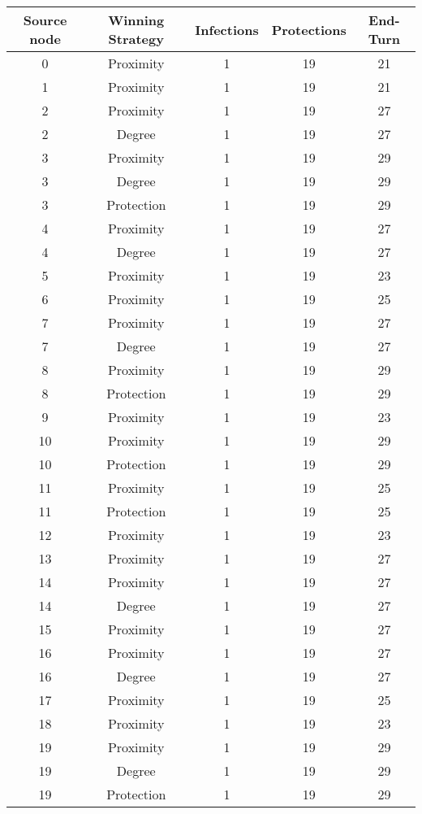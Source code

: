 \documentclass[results.tex]{subfiles}
\begin{document}
\begin{center}
  \begin{tabular}{| c || c | c | c | c |}
    \hline
    {\bfseries Source node} & {\bfseries Winning Strategy} & {\bfseries Infections} & {\bfseries Protections} & {\bfseries End-Turn} \\  %
    \hline\hline
    0 & Proximity & 1 & 19 & 21 \\
    \hline
    1 & Proximity & 1 & 19 & 21 \\
    \hline
    2 & Proximity & 1 & 19 & 27 \\
    \hline
    2 & Degree & 1 & 19 & 27 \\
    \hline
    3 & Proximity & 1 & 19 & 29 \\
    \hline
    3 & Degree & 1 & 19 & 29 \\
    \hline
    3 & Protection & 1 & 19 & 29 \\
    \hline
    4 & Proximity & 1 & 19 & 27 \\
    \hline
    4 & Degree & 1 & 19 & 27 \\
    \hline
    5 & Proximity & 1 & 19 & 23 \\
    \hline
    6 & Proximity & 1 & 19 & 25 \\
    \hline
    7 & Proximity & 1 & 19 & 27 \\
    \hline
    7 & Degree & 1 & 19 & 27 \\
    \hline
    8 & Proximity & 1 & 19 & 29 \\
    \hline
    8 & Protection & 1 & 19 & 29 \\
    \hline
    9 & Proximity & 1 & 19 & 23 \\
    \hline
    10 & Proximity & 1 & 19 & 29 \\
    \hline
    10 & Protection & 1 & 19 & 29 \\
    \hline
    11 & Proximity & 1 & 19 & 25 \\
    \hline 
    11 & Protection & 1 & 19 & 25 \\
    \hline
    12 & Proximity & 1 & 19 & 23 \\
    \hline
    13 & Proximity & 1 & 19 & 27 \\
    \hline
    14 & Proximity & 1 & 19 & 27 \\
    \hline
    14 & Degree & 1 & 19 & 27 \\
    \hline
    15 & Proximity & 1 & 19 & 27 \\
    \hline 
    16 & Proximity & 1 & 19 & 27 \\
    \hline
    16 & Degree & 1 & 19 & 27 \\
    \hline
    17 & Proximity & 1 & 19 & 25 \\
    \hline
    18 & Proximity & 1 & 19 & 23 \\
    \hline
    19 & Proximity & 1 & 19 & 29 \\
    \hline
    19 & Degree & 1 & 19 & 29 \\
    \hline
    19 & Protection & 1 & 19 & 29 \\
    \hline
  \end{tabular}
\end{center}
\end{document}
